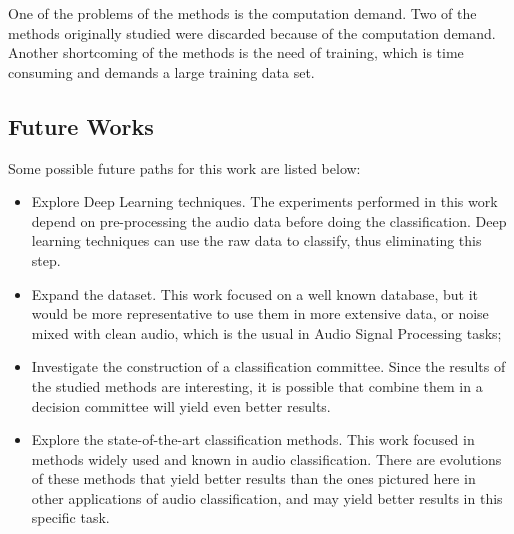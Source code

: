 \documentclass[12pt]{article}
\begin{document}
One of the problems of the methods is the computation demand. Two of the methods originally studied were discarded because of the computation demand. Another shortcoming of the methods is the need of training, which is time consuming and demands a large training data set.

\subsection{Future Works}

Some possible future paths for this work are listed below:

\begin{itemize}
	\item Explore Deep Learning techniques. The experiments performed in this work depend on pre-processing the audio data before doing the classification. Deep learning techniques can use the raw data to classify, thus eliminating this step. 
	\item Expand the dataset. This work focused on a well known database, but it would be more representative to use them in more extensive data, or noise mixed with clean audio, which is the usual in Audio Signal Processing tasks;
	\item Investigate the construction of a classification committee. Since the results of the studied methods are interesting, it is possible that combine them in a decision committee will yield even better results.
	\item Explore the state-of-the-art classification methods. This work focused in methods widely used and known in audio classification. There are evolutions of these methods that yield better results than the ones pictured here in other applications of audio classification, and may yield better results in this specific task.
\end{itemize}




\end{document}
